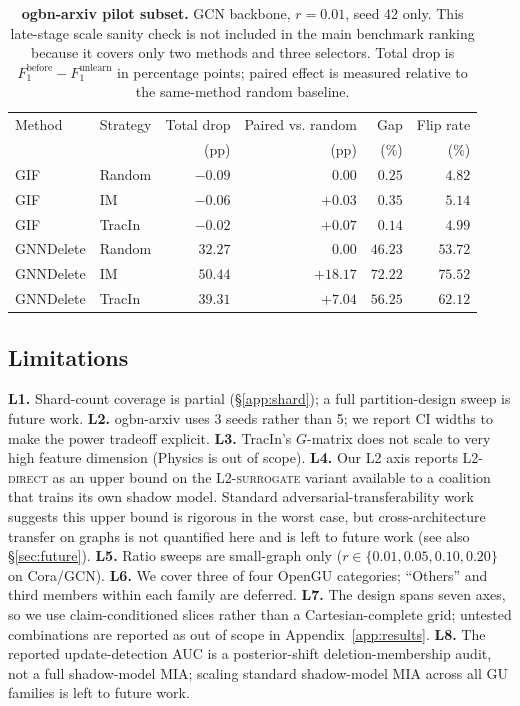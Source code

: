 \begin{table}[t]
\centering
\footnotesize
\setlength{\tabcolsep}{5pt}
\caption{\textbf{ogbn-arxiv pilot subset.}
GCN backbone, $r{=}0.01$, seed 42 only. This late-stage scale sanity
check is not included in the main benchmark ranking because it covers
only two methods and three selectors. Total drop is
$F_1^{\mathrm{before}}-F_1^{\mathrm{unlearn}}$ in percentage points;
paired effect is measured relative to the same-method random baseline.}
\label{tab:arxiv-pilot}
\begin{tabular}{llrrrr}
\toprule
Method & Strategy & Total drop & Paired vs. random & Gap & Flip rate \\
       &          & (pp)       & (pp)              & (\%) & (\%) \\
\midrule
GIF       & Random & $-0.09$ & $0.00$   & $0.25$ & $4.82$ \\
GIF       & IM     & $-0.06$ & $+0.03$  & $0.35$ & $5.14$ \\
GIF       & TracIn & $-0.02$ & $+0.07$  & $0.14$ & $4.99$ \\
\midrule
GNNDelete & Random & $32.27$ & $0.00$   & $46.23$ & $53.72$ \\
GNNDelete & IM     & $50.44$ & $+18.17$ & $72.22$ & $75.52$ \\
GNNDelete & TracIn & $39.31$ & $+7.04$  & $56.25$ & $62.12$ \\
\bottomrule
\end{tabular}
\end{table}

\subsection{Limitations}
\label{sec:limitations}

\textbf{L1.} Shard-count coverage is partial (\S\ref{app:shard}); a
full partition-design sweep is future work.
\textbf{L2.} ogbn-arxiv uses 3 seeds rather than 5; we report CI widths
to make the power tradeoff explicit.
\textbf{L3.} TracIn's $G$-matrix does not scale to very high feature
dimension (Physics is out of scope).
\textbf{L4.} Our L2 axis reports L2-\textsc{direct} as an upper bound on
the L2-\textsc{surrogate} variant available to a coalition that trains
its own shadow model. Standard adversarial-transferability
work~\cite{papernot2017practical,demontis2019adversarial} suggests this
upper bound is rigorous in the worst case, but cross-architecture
transfer on graphs is not quantified here and is left to future work
(see also \S\ref{sec:future}).
\textbf{L5.} Ratio sweeps are small-graph only
($r\in\{0.01,0.05,0.10,0.20\}$ on Cora/GCN).
\textbf{L6.} We cover three of four OpenGU categories; ``Others'' and
third members within each family are deferred.
\textbf{L7.} The design spans seven axes, so we use claim-conditioned
slices rather than a Cartesian-complete grid; untested combinations are
reported as out of scope in Appendix~\ref{app:results}.
\textbf{L8.} The reported update-detection AUC is a posterior-shift
deletion-membership audit, not a full shadow-model MIA; scaling standard
shadow-model MIA across all GU families is left to future work.

